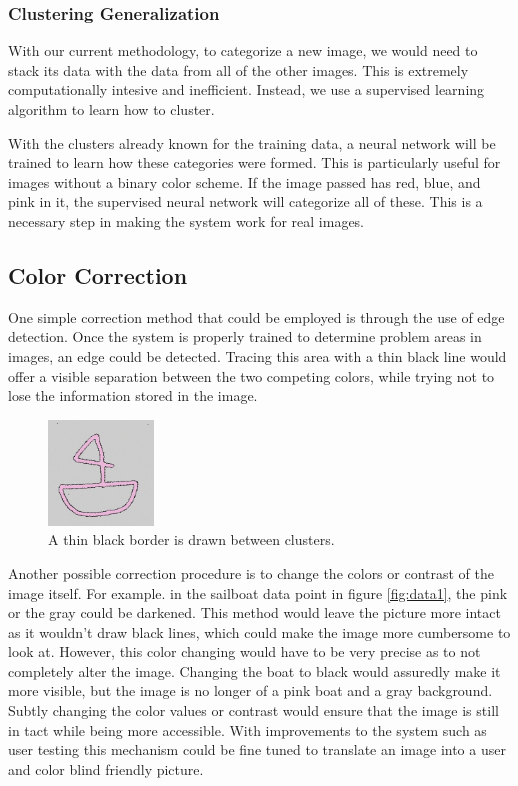 \documentclass[12pt]{article}
\begin{document}
\begin{multicols}{2}
\subsubsection{Clustering Generalization}
With our current methodology, to categorize a new image, we would need to stack its data with the data from all of the other images. This is extremely computationally intesive and inefficient. Instead, we use a supervised learning algorithm to learn how to cluster.

With the clusters already known for the training data, a neural network will be trained to learn how these categories were formed. This is particularly useful for images without a binary color scheme. If the image passed has red, blue, and pink in it, the supervised neural network will categorize all of these. This is a necessary step in making the system work for real images.



\subsection{Color Correction}

One simple correction method that could be employed is through the use of edge detection. Once the system is properly trained to determine problem areas in images, an edge could be detected. Tracing this area with a thin black line would offer a visible separation between the two competing colors, while trying not to lose the information stored in the image.

\begin{figure}[H]
	\centering
	\includegraphics[width=0.25\textwidth]{img/noise_data2_border.png}
	\caption{A thin black border is drawn between clusters.}
	\label{fig:border1}
\end{figure}

Another possible correction procedure is to change the colors or contrast of the image itself. For example. in the sailboat data point in figure \ref{fig:data1}, the pink or the gray could be darkened. This method would leave the picture more intact as it wouldn't draw black lines, which could make the image more cumbersome to look at. However, this color changing would have to be very precise as to not completely alter the image. Changing the boat to black would assuredly make it more visible, but the image is no longer of a pink boat and a gray background. Subtly changing the color values or contrast would ensure that the image is still in tact while being more accessible. With improvements to the system such as user testing this mechanism could be fine tuned to translate an image into a user and color blind friendly picture.



\end{multicols}
\end{document}
